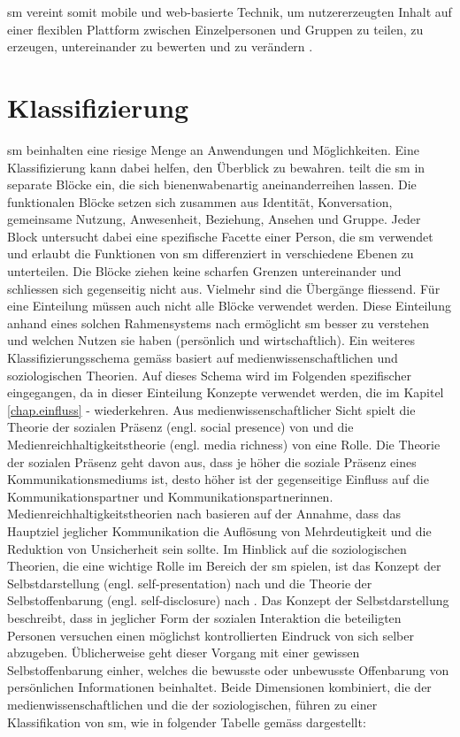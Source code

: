 \gls{sm} vereint somit mobile und web-basierte Technik, um nutzererzeugten Inhalt auf einer flexiblen Plattform zwischen Einzelpersonen und Gruppen zu teilen, zu erzeugen, untereinander zu bewerten und zu verändern \cite{Kietzmann:2011}.
 
\section{Klassifizierung}\label{sec.klassifiezierung}
\gls{sm} beinhalten eine riesige Menge an Anwendungen und Möglichkeiten. Eine Klassifizierung kann dabei helfen, den Überblick zu bewahren.  teilt die \gls{sm} in separate Blöcke ein, die sich bienenwabenartig aneinanderreihen lassen. Die funktionalen Blöcke setzen sich zusammen aus Identität, Konversation, gemeinsame Nutzung, Anwesenheit, Beziehung, Ansehen und Gruppe. Jeder Block untersucht dabei eine spezifische Facette einer Person, die \gls{sm} verwendet und erlaubt die Funktionen von \gls{sm} differenziert in verschiedene Ebenen zu unterteilen. Die Blöcke ziehen keine scharfen Grenzen untereinander und schliessen sich gegenseitig nicht aus. Vielmehr sind die Übergänge fliessend. Für eine Einteilung müssen auch nicht alle Blöcke verwendet werden. Diese Einteilung anhand eines solchen Rahmensystems nach \citeauthor{Kietzmann:2011} ermöglicht \gls{sm} besser zu verstehen und welchen Nutzen sie haben (persönlich und wirtschaftlich). \newline
Ein weiteres Klassifizierungsschema gemäss  basiert auf medienwissenschaftlichen und soziologischen Theorien. Auf dieses Schema wird im Folgenden spezifischer eingegangen, da in dieser Einteilung Konzepte verwendet werden, die im Kapitel \ref{chap.einfluss} -  wiederkehren. Aus medienwissenschaftlicher Sicht spielt die Theorie der sozialen Präsenz (engl. social presence) von  und die Medienreichhaltigkeitstheorie (engl. media richness) von  eine Rolle. Die Theorie der sozialen Präsenz geht davon aus, dass je höher die soziale Präsenz eines Kommunikationsmediums ist, desto höher ist der gegenseitige Einfluss auf die Kommunikationspartner und Kommunikationspartnerinnen. Medienreichhaltigkeitstheorien nach  basieren auf der Annahme, dass das Hauptziel jeglicher Kommunikation die Auflösung von Mehrdeutigkeit und die Reduktion von Unsicherheit sein sollte. Im Hinblick auf die soziologischen Theorien, die eine wichtige Rolle im Bereich der \gls{sm} spielen, ist das Konzept der Selbstdarstellung (engl. self-presentation) nach  und die Theorie der Selbstoffenbarung (engl. self-disclosure) nach . Das Konzept der Selbstdarstellung beschreibt, dass in jeglicher Form der sozialen Interaktion die beteiligten Personen versuchen einen möglichst kontrollierten Eindruck von sich selber abzugeben. Üblicherweise geht dieser Vorgang mit einer gewissen Selbstoffenbarung einher, welches die bewusste oder unbewusste Offenbarung von persönlichen Informationen beinhaltet. Beide Dimensionen kombiniert, die der medienwissenschaftlichen und die der soziologischen,  führen zu einer Klassifikation von \gls{sm}, wie in folgender Tabelle gemäss  dargestellt:	
